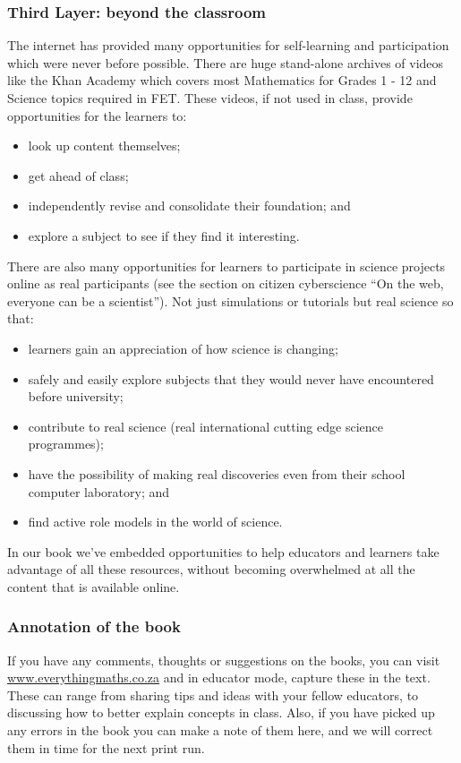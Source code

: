 \subsubsection{Third Layer: beyond the classroom}
The internet has provided many opportunities for self-learning and participation which were never before possible. There are huge stand-alone archives of videos like the Khan Academy which covers most Mathematics for Grades 1 - 12 and Science topics required in FET. These videos, if not used in class, provide opportunities for the learners to:
\begin{itemize}[noitemsep]
\item look up content themselves;
\item get ahead of class;
\item independently revise and consolidate their foundation; and
\item explore a subject to see if they find it interesting.
\end{itemize}
There are also many opportunities for learners to participate in science projects online as real participants (see the section on citizen cyberscience “On the web, everyone can be a scientist”). Not just simulations or tutorials but real science so that:
\begin{itemize}[noitemsep]
\item learners gain an appreciation of how science is changing;
\item safely and easily explore subjects that they would never have encountered before university;
\item contribute to real science (real international cutting edge science programmes);
\item have the possibility of making real discoveries even from their school computer laboratory; and
\item find active role models in the world of science.
\end{itemize}
In our book we've embedded opportunities to help educators and learners take advantage of all these resources, without becoming overwhelmed at all the content that is available online. 

\subsubsection{Annotation of the book}
If you have any comments, thoughts or suggestions on the books, you can visit  \underline{www.everythingmaths.co.za} and in educator mode, capture these in the text. These can range from sharing tips and ideas with your fellow educators, to discussing how to better explain concepts in class. Also, if you have picked up any errors in the book you can make a note of them here, and we will correct them in time for the next print run.\par

